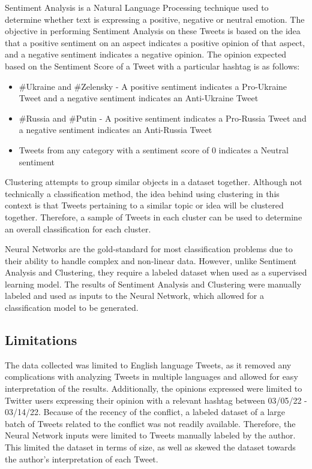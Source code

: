 \documentclass[12pt,letterpaper,oneside,titlepage]{article}
\begin{document}
Sentiment Analysis is a Natural Language Processing technique used to determine whether text is expressing a positive, negative or neutral emotion. 
The objective in performing Sentiment Analysis on these Tweets is based on the idea that a positive sentiment on an aspect 
indicates a positive opinion of that aspect, and a negative sentiment indicates a negative opinion. 
The opinion expected based on the Sentiment Score of a Tweet with a particular hashtag is as follows:

\begin{itemize}
    \item \#Ukraine and \#Zelensky - A positive sentiment indicates a Pro-Ukraine Tweet and a negative sentiment indicates an Anti-Ukraine Tweet
    \item \#Russia and \#Putin - A positive sentiment indicates a Pro-Russia Tweet and a negative sentiment indicates an Anti-Russia Tweet
    \item Tweets from any category with a sentiment score of 0 indicates a Neutral sentiment
\end{itemize}

Clustering attempts to group similar objects in a dataset together. Although not technically a classification method, the idea
behind using clustering in this context is that Tweets pertaining to a similar topic or idea will be clustered together. Therefore, a sample  of Tweets in each cluster can be used to determine an overall classification for each cluster.

Neural Networks are the gold-standard for most classification problems due to their ability to handle complex and non-linear data\cite{txbk_ann}. However, unlike Sentiment Analysis and Clustering,
they require a labeled dataset when used as a supervised learning model\cite{ibm}. The results of Sentiment Analysis and Clustering were manually labeled and used as inputs to the Neural Network, which allowed for a classification model to be generated.

\subsection{Limitations}\label{subsec:limitations}

The data collected was limited to English language Tweets, as it removed any complications with analyzing Tweets in multiple languages and allowed for easy interpretation of the results. 
Additionally, the opinions expressed were limited to Twitter users expressing their opinion with a relevant hashtag between 03/05/22 - 03/14/22. Because of the recency of the conflict, a labeled dataset  of a large batch of Tweets 
related to the conflict was not readily available.
Therefore, the Neural Network inputs were limited to Tweets manually labeled by the author. 
This limited the dataset in terms of size, as well as skewed the dataset towards the author's interpretation of each Tweet.
\end{document}
